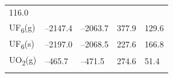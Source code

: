 \documentclass[
  9pt,
]{extbook}
\theoremstyle{definition}
\theoremstyle{definition}
\theoremstyle{definition}
\theoremstyle{remark}
\begin{document}
\begin{longtable}[]{@{}lllll@{}}
\begin{minipage}[t]{0.18\columnwidth}
116.0\strut
\end{minipage}\tabularnewline
\begin{minipage}[t]{0.10\columnwidth}\raggedright
UF\textsubscript{6}(g)\strut
\end{minipage} & \begin{minipage}[t]{0.19\columnwidth}\raggedright
--2147.4\strut
\end{minipage} & \begin{minipage}[t]{0.20\columnwidth}\raggedright
--2063.7\strut
\end{minipage} & \begin{minipage}[t]{0.18\columnwidth}\raggedright
377.9\strut
\end{minipage} & \begin{minipage}[t]{0.18\columnwidth}\raggedright
129.6\strut
\end{minipage}\tabularnewline
\begin{minipage}[t]{0.10\columnwidth}\raggedright
UF\textsubscript{6}(s)\strut
\end{minipage} & \begin{minipage}[t]{0.19\columnwidth}\raggedright
--2197.0\strut
\end{minipage} & \begin{minipage}[t]{0.20\columnwidth}\raggedright
--2068.5\strut
\end{minipage} & \begin{minipage}[t]{0.18\columnwidth}\raggedright
227.6\strut
\end{minipage} & \begin{minipage}[t]{0.18\columnwidth}\raggedright
166.8\strut
\end{minipage}\tabularnewline
\begin{minipage}[t]{0.10\columnwidth}\raggedright
UO\textsubscript{2}(g)\strut
\end{minipage} & \begin{minipage}[t]{0.19\columnwidth}\raggedright
--465.7\strut
\end{minipage} & \begin{minipage}[t]{0.20\columnwidth}\raggedright
--471.5\strut
\end{minipage} & \begin{minipage}[t]{0.18\columnwidth}\raggedright
274.6\strut
\end{minipage} & \begin{minipage}[t]{0.18\columnwidth}\raggedright
51.4\strut
\end{minipage}\tabularnewline
\begin{minipage}[t]{0.10\columnwidth}\raggedright

\end{minipage}
\end{longtable}
\end{document}
